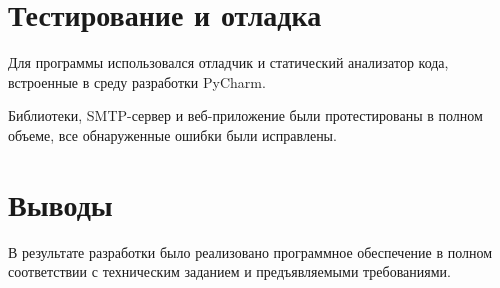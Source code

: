 

\section{Тестирование и отладка}

Для программы использовался отладчик и статический анализатор кода, встроенные в среду разработки PyCharm.

Библиотеки, SMTP-сервер и веб-приложение были протестированы в полном объеме, все обнаруженные ошибки были исправлены.

\section{Выводы}

В результате разработки было реализовано программное обеспечение в полном соответствии с техническим заданием и предъявляемыми требованиями.